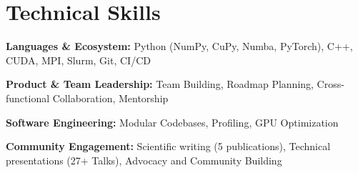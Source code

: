 \section*{Technical Skills}
\begin{tabitemize}[leftmargin=*]
  \item \textbf{Languages \& Ecosystem:} Python (NumPy, CuPy, Numba, PyTorch), C++, CUDA, MPI, Slurm, Git, CI/CD
  \item \textbf{Product \& Team Leadership:} Team Building, Roadmap Planning, Cross-functional Collaboration, Mentorship
  \item \textbf{Software Engineering:} Modular Codebases, Profiling, GPU Optimization
  \item \textbf{Community Engagement:} Scientific writing (5 publications), Technical presentations (27+ Talks), Advocacy and Community Building
\end{tabitemize}
\vspace{-0.3\baselineskip}
